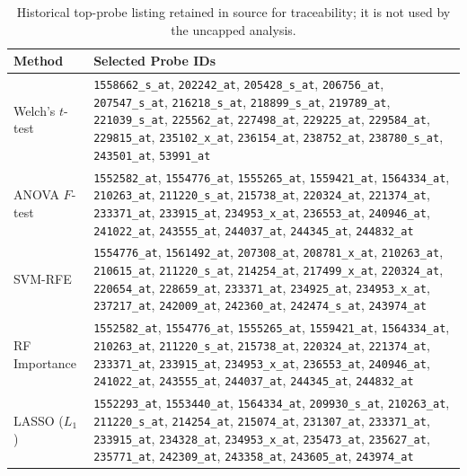 \begin{table}[H]
\centering
\caption{Historical top-probe listing retained in source for traceability; it is not used by the uncapped analysis.}
\label{tab:gse42568_probes}
\small
\begin{tabular}{lp{10cm}}
\toprule
\textbf{Method} & \textbf{Selected Probe IDs} \\
\midrule
Welch's $t$-test &
  \texttt{1558662\_s\_at}, \texttt{202242\_at}, \texttt{205428\_s\_at}, \texttt{206756\_at},
  \texttt{207547\_s\_at}, \texttt{216218\_s\_at}, \texttt{218899\_s\_at}, \texttt{219789\_at},
  \texttt{221039\_s\_at}, \texttt{225562\_at}, \texttt{227498\_at}, \texttt{229225\_at},
  \texttt{229584\_at}, \texttt{229815\_at}, \texttt{235102\_x\_at}, \texttt{236154\_at},
  \texttt{238752\_at}, \texttt{238780\_s\_at}, \texttt{243501\_at}, \texttt{53991\_at} \\
\midrule
ANOVA $F$-test &
  \texttt{1552582\_at}, \texttt{1554776\_at}, \texttt{1555265\_at}, \texttt{1559421\_at},
  \texttt{1564334\_at}, \texttt{210263\_at}, \texttt{211220\_s\_at}, \texttt{215738\_at},
  \texttt{220324\_at}, \texttt{221374\_at}, \texttt{233371\_at}, \texttt{233915\_at},
  \texttt{234953\_x\_at}, \texttt{236553\_at}, \texttt{240946\_at}, \texttt{241022\_at},
  \texttt{243555\_at}, \texttt{244037\_at}, \texttt{244345\_at}, \texttt{244832\_at} \\
\midrule
SVM-RFE &
  \texttt{1554776\_at}, \texttt{1561492\_at}, \texttt{207308\_at}, \texttt{208781\_x\_at},
  \texttt{210263\_at}, \texttt{210615\_at}, \texttt{211220\_s\_at}, \texttt{214254\_at},
  \texttt{217499\_x\_at}, \texttt{220324\_at}, \texttt{220654\_at}, \texttt{228659\_at},
  \texttt{233371\_at}, \texttt{234925\_at}, \texttt{234953\_x\_at}, \texttt{237217\_at},
  \texttt{242009\_at}, \texttt{242360\_at}, \texttt{242474\_s\_at}, \texttt{243974\_at} \\
\midrule
RF Importance &
  \texttt{1552582\_at}, \texttt{1554776\_at}, \texttt{1555265\_at}, \texttt{1559421\_at},
  \texttt{1564334\_at}, \texttt{210263\_at}, \texttt{211220\_s\_at}, \texttt{215738\_at},
  \texttt{220324\_at}, \texttt{221374\_at}, \texttt{233371\_at}, \texttt{233915\_at},
  \texttt{234953\_x\_at}, \texttt{236553\_at}, \texttt{240946\_at}, \texttt{241022\_at},
  \texttt{243555\_at}, \texttt{244037\_at}, \texttt{244345\_at}, \texttt{244832\_at} \\
\midrule
LASSO ($L_1$) &
  \texttt{1552293\_at}, \texttt{1553440\_at}, \texttt{1564334\_at}, \texttt{209930\_s\_at},
  \texttt{210263\_at}, \texttt{211220\_s\_at}, \texttt{214254\_at}, \texttt{215074\_at},
  \texttt{231307\_at}, \texttt{233371\_at}, \texttt{233915\_at}, \texttt{234328\_at},
  \texttt{234953\_x\_at}, \texttt{235473\_at}, \texttt{235627\_at}, \texttt{235771\_at},
  \texttt{242309\_at}, \texttt{243358\_at}, \texttt{243605\_at}, \texttt{243974\_at} \\
\bottomrule
\end{tabular}
\end{table}

